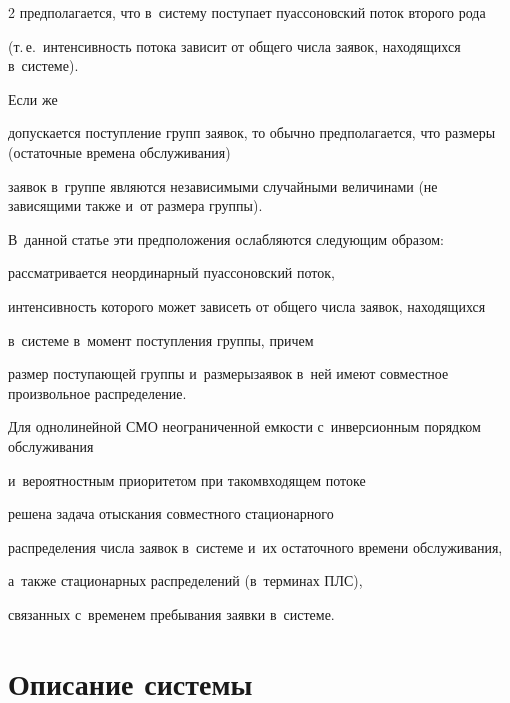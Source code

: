 \begin{multicols}{2}
предполагается, что в~систему поступает пуассоновский поток второго рода


(т.\,е.\ интенсивность потока зависит от общего числа заявок, находящихся в~сис\-те\-ме). 


Если же


допускается поступление групп заявок, то обычно предполагается, что размеры (остаточные времена обслуживания)


заявок в~группе являются независимыми случайными величинами (не зависящими также и~от размера группы).





В~данной статье эти предположения ослабляются следующим образом:


рассматривается неординарный пуассоновский поток,


интенсивность которого может зависеть от общего числа заявок, находящих\-ся


в~системе в~момент поступления группы, причем


размер  поступающей группы и~размеры\linebreak заявок в~ней имеют совместное произвольное распределение.


Для однолинейной СМО неограниченной емкости с~инверсионным порядком обслуживания 


и~вероятностным приоритетом при таком\linebreak входя\-щем потоке


решена задача отыскания совместного стационарного


распределения числа заявок в~сис\-те\-ме и~их остаточного времени обслуживания,


а~также стационарных распределений (в~терминах ПЛС),


связанных с~временем пребывания заявки в~системе.





\vspace*{-4pt}





\section{Описание системы}





\vspace*{-2pt}






\end{multicols}
